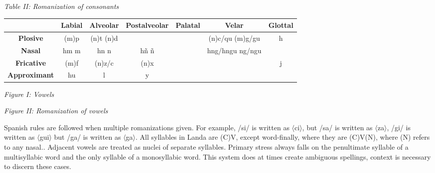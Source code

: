 \documentclass{article}[10pt]
\begin{document}
\begin{center}
\emph{Table II: Romanization of consonants}
\begin{tabular}{ |c|c|c|c|c|c|c| }
\hline
 & \bf{Labial} & \bf{Alveolar} & \bf{Postalveolar} & \bf{Palatal} & \bf{Velar} & \bf{Glottal} \\ \hline
\bf{Plosive} & (m)p & (n)t (n)d & & & (n)c/qu (m)g/gu & h \\ \hline
\bf{Nasal} & hm m & hn n & h\~{n} \~{n} & & hng/hngu ng/ngu & \\ \hline
\bf{Fricative} & (m)f & (n)z/c & (n)x & & & j \\ \hline
\bf{Approximant} & hu & l & y & & & \\ \hline
\end{tabular}
\end{center}

\begin{multicols}{2}
{\begin{center}
\emph{Figure I: Vowels}\\
 \Large
\begin{vowel}
\end{vowel} \end{center}}

{\begin{center}
\emph{Figure II: Romanization of vowels}\\
 \Large
\begin{vowel}
\end{vowel} \end{center}}
\end{multicols}

Spanish rules are followed when multiple romanizations given. For example, /si/ is written as $\langle$ci$\rangle$, but /sa/ is written as $\langle$za$\rangle$, /gi/ is written as $\langle$gui$\rangle$ but /ga/ is written as $\langle$ga$\rangle$. All syllables in Landa are (C)V, except word-finally, where they are (C)V(N), where (N) refers to any nasal.. Adjacent vowels are treated as nuclei of separate syllables. Primary stress always falls on the penultimate syllable of a multisyllabic word and the only syllable of a monosyllabic word. This system does at times create ambiguous spellings, context is necessary to discern these cases.
\end{document}
